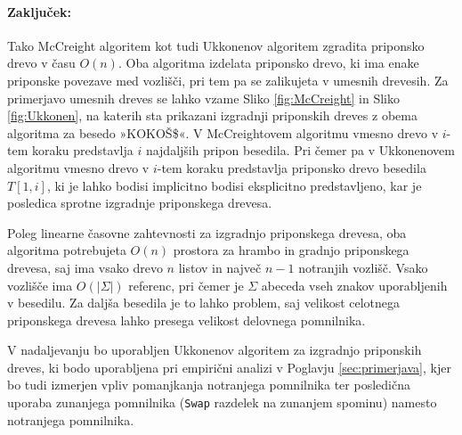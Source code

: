 \paragraph{Zaključek:}
Tako McCreight algoritem \cite{McCreight1976} kot tudi  Ukkonenov algoritem \cite{Ukkonen1995} zgradita priponsko drevo v času $O(n)$. Oba algoritma izdelata priponsko drevo, ki ima enake priponske povezave med vozlišči, pri tem pa se zalikujeta v umesnih drevesih. Za primerjavo umesnih dreves se lahko vzame Sliko \ref{fig:McCreight} in Sliko \ref{fig:Ukkonen}, na katerih sta prikazani izgradnji priponskih dreves z obema algoritma za besedo »KOKOŠ\$«. V McCreightovem algoritmu vmesno drevo v $i$-tem koraku predstavlja $i$ najdaljših pripon besedila. Pri čemer pa v Ukkonenovem algoritmu vmesno drevo v $i$-tem koraku predstavlja priponsko drevo besedila $T[1,i]$, ki je lahko bodisi implicitno bodisi eksplicitno predstavljeno, kar je posledica sprotne izgradnje priponskega drevesa.

Poleg linearne časovne zahtevnosti za izgradnjo priponskega drevesa, oba algoritma potrebujeta $O(n)$ prostora za hrambo in gradnjo priponskega drevesa, saj ima vsako drevo $n$ listov in največ $n-1$ notranjih vozlišč. Vsako vozlišče ima $O(|\Sigma|)$ referenc, pri čemer je $\Sigma$ abeceda vseh znakov uporabljenih v besedilu. Za daljša besedila je to lahko problem, saj velikost celotnega priponskega drevesa lahko presega velikost delovnega pomnilnika.

V nadaljevanju bo uporabljen Ukkonenov algoritem za izgradnjo priponskih dreves, ki bodo uporabljena pri empirični analizi v Poglavju \ref{sec:primerjava}, kjer bo tudi izmerjen vpliv pomanjkanja notranjega pomnilnika ter posledična uporaba zunanjega pomnilnika (\verb|Swap| razdelek na zunanjem spominu) namesto notranjega pomnilnika.